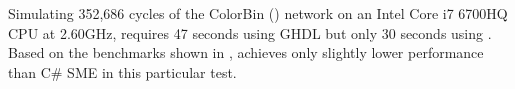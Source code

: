 Simulating 352,686 cycles of the ColorBin () network on an
Intel Core i7 6700HQ CPU at 2.60GHz, requires 47 seconds using GHDL but only 30
seconds using \libsme. Based on the benchmarks shown in \cite{skovhede2017c++},
\libsme{} achieves only slightly lower performance than C\# SME in this
particular test.


